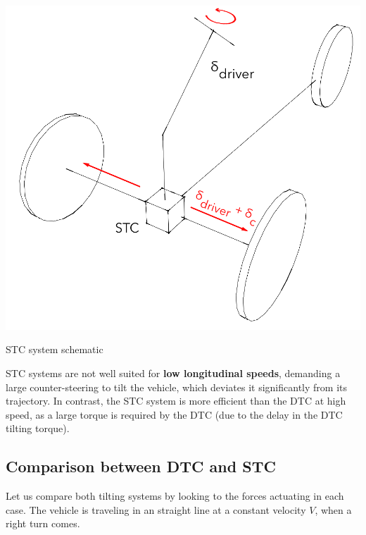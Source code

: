 \begin{marginfigure}
	\includegraphics[width=1.0\linewidth]{figs/02/stc_diagram}
	\caption{STC system schematic}
\end{marginfigure}

STC systems are not well suited for \textbf{low longitudinal speeds}, demanding a large counter-steering to tilt the vehicle, which deviates it significantly from its trajectory. In contrast, the STC system is more efficient than the DTC at high speed, as a large torque is required by the DTC (due to the delay in the DTC tilting torque).
\newpage

\subsection{Comparison between DTC and STC}

Let us compare both tilting systems by looking to the forces actuating in each case. The vehicle is traveling in an straight line at a constant velocity $V$, when a right turn comes.


